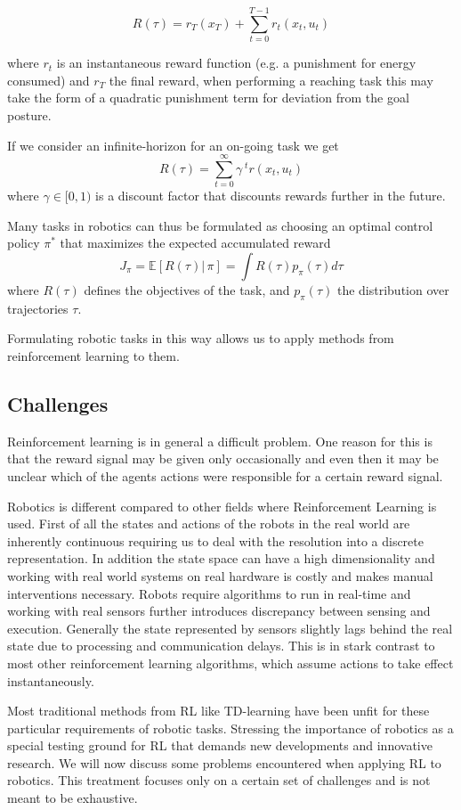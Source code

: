 $$ R(\tau) = r_T(x_T) + \sum^{T-1}_{t=0} r_t(x_t,u_t) $$

where $r_t$ is an instantaneous reward function (e.g. a punishment for energy consumed)
and $r_T$ the final reward, when performing a reaching task this may take the
form of a quadratic punishment term for deviation from the goal posture.

If we consider an infinite-horizon for an on-going task we get
$$ R(\tau) = \sum^{\infty}_{t=0} \gamma^{\; t} r(x_t, u_t) $$
where $\gamma \in [0,1)$ is a discount factor that discounts rewards further in the future.

Many tasks in robotics can thus be formulated as choosing an optimal control
policy $\pi^*$ that maximizes the expected accumulated reward
$$ J_{\pi} = \mathbb{E}[R(\tau) |\, \pi] = \int R(\tau) p_{\pi}(\tau) d\tau $$
where $R(\tau)$ defines the objectives of the task, and $p_{\pi}(\tau)$ the
distribution over trajectories $\tau$.

Formulating robotic tasks in this way allows us to apply methods from
reinforcement learning to them. 

\subsection{Challenges}
Reinforcement learning is in general a difficult problem. One reason
for this is that the reward signal may be given only occasionally and
even then it may be unclear which of
the agents actions were responsible for a certain
reward signal. 

Robotics is different compared to other fields where Reinforcement Learning
is used. First of all the states and actions of the robots in the
real world are inherently continuous requiring us to
deal with the resolution into a discrete representation.
In addition the state space can have a high dimensionality and
working with real world systems on real hardware is costly and
makes manual interventions necessary.
Robots require algorithms to run in real-time and working with
real sensors further introduces discrepancy between sensing and
execution.
Generally the state represented by sensors slightly lags behind the real
state due to processing and communication delays. This is in stark contrast to
most other reinforcement learning algorithms, which assume actions to
take effect instantaneously.


Most traditional methods from RL like
TD-learning \citep{sutton2018reinforcement}
have been unfit for these particular requirements of robotic tasks.
Stressing the importance of robotics as a special testing ground for RL that
demands new developments and innovative research.
We will now discuss some problems encountered when applying
RL to robotics. This treatment focuses only on a certain
set of challenges and is not meant to be exhaustive.


